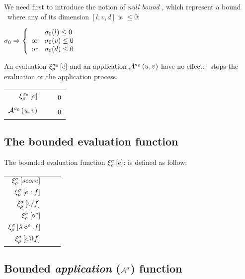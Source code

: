 \documentclass[10pt,a4paper,frenchb]{article}
\makeatletter
\newcommand{\evaltable}[1][$\rightarrow$]	  {\begin{center} \begin{tabular*}{\linewidth}{rc@{ #1 }l}}
\newcommand{\evaltablend}  		{\end{tabular*}\end{center}}
\newcommand{\evalspace}	  		{\vspace{2mm}\\}
\newcommand{\ra}					{\ensuremath{\rightarrow}}
\makeatother
\begin{document}
We need first to introduce the notion of \emph{null bound} \nullbounds, which represent a bound \bounds \ where any of its dimension  $[l, v, d]$ is $\leq 0$:
\begin{center}
$\nullbounds \Rightarrow \left\{ \begin{array}{ll}
 										 &  \nullbounds(l) \leq 0 \\
 								\mathrm{or} &  \nullbounds(v) \leq 0 \\
 								\mathrm{or} &  \nullbounds(d) \leq 0 \\
	 							\end{array} \right.$
\end{center}
An evaluation $\evalexpr[\nullbounds]{e}$ and an application $\apply[\nullbounds]{u}{v}$ have no effect: \nullbounds \ stops the evaluation or the application process.
\begin{center}
\begin{tabular}{rc@{\ra}l}
 $\evalexpr[\nullbounds]{e}$ 		& & \ $\result{0}{\bounds(l:=0, v:=0, d:=0)}$ \\
 $\apply[\nullbounds]{u}{v}$  		& & \ $\result{0}{\bounds(l:=0, v:=0, d:=0)}$
\end{tabular}
\end{center}


\subsection{The bounded evaluation function \boundevalsym}

The bounded evaluation function $\evalexpr{e}$: \edomain{\expr}{\env}{\val} is defined as follow: 
\evaltable
 \hline
 $\evalexpr{score}$	& & \bevalScore{score} 
 \evalspace
 $\evalexpr{\opexpr{\seq}}$	 	&  &  \bevalSeq{e}{f} 
 \evalspace
 $\evalexpr{\opexpr{\mix}}$	 &  &  \bevalMix{e}{f} 
 \evalspace
 $\evalexpr{\var{e}}$ 	&  & \headOp{\top(\ \envsym(\var{e}), \bounds(v))}{\bounds(l))} 
 \evalspace
 $\evalexpr{\lambdaexpr{e}{f}}$ 	& & \bevalLambda{e}{f}{\envsym}{\bounds} 
 \evalspace
 $\evalexpr{\opexpr{\applyop}}$ 	&  & \bevalApply{e}{f} \\
 \hline
\evaltablend

\subsection{Bounded \emph{application} ($\boundapplysym{\bounds} $) function}
\end{document}
